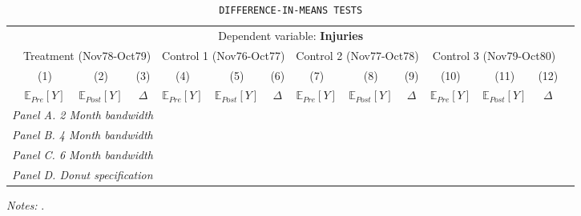  \begin{table}[H] \begin{threeparttable} \centering \caption{\texttt{DIFFERENCE-IN-MEANS TESTS}} {\def\sym#1{\ifmmode^{#1}\else\(^{#1}\)\fi} \begin{tabular}{l*{13}{c}} \toprule & \multicolumn{12}{c}{Dependent variable: \textbf{Injuries}} \\ \cmidrule(lr){2-13}
            &\multicolumn{3}{c}{Treatment (Nov78-Oct79)}&\multicolumn{3}{c}{Control 1 (Nov76-Oct77)}&\multicolumn{3}{c}{Control 2 (Nov77-Oct78)}&\multicolumn{3}{c}{Control 3 (Nov79-Oct80)}\\\cmidrule(lr){2-4}\cmidrule(lr){5-7}\cmidrule(lr){8-10}\cmidrule(lr){11-13}
            &\multicolumn{1}{c}{(1)}&\multicolumn{1}{c}{(2)}&\multicolumn{1}{c}{(3)}&\multicolumn{1}{c}{(4)}&\multicolumn{1}{c}{(5)}&\multicolumn{1}{c}{(6)}&\multicolumn{1}{c}{(7)}&\multicolumn{1}{c}{(8)}&\multicolumn{1}{c}{(9)}&\multicolumn{1}{c}{(10)}&\multicolumn{1}{c}{(11)}&\multicolumn{1}{c}{(12)}\\
            &\multicolumn{1}{c}{$\mathbb{E}_{Pre}[Y]$}&\multicolumn{1}{c}{$\mathbb{E}_{Post}[Y]$}&\multicolumn{1}{c}{$\Delta$}&\multicolumn{1}{c}{$\mathbb{E}_{Pre}[Y]$}&\multicolumn{1}{c}{$\mathbb{E}_{Post}[Y]$}&\multicolumn{1}{c}{$\Delta$}&\multicolumn{1}{c}{$\mathbb{E}_{Pre}[Y]$}&\multicolumn{1}{c}{$\mathbb{E}_{Post}[Y]$}&\multicolumn{1}{c}{$\Delta$}&\multicolumn{1}{c}{$\mathbb{E}_{Pre}[Y]$}&\multicolumn{1}{c}{$\mathbb{E}_{Post}[Y]$}&\multicolumn{1}{c}{$\Delta$}\\
\midrule
 \multicolumn{13}{l}{\emph{Panel A. 2 Month bandwidth}} \\    \midrule\multicolumn{13}{l}{\emph{Panel B. 4 Month bandwidth}} \\    \midrule\multicolumn{13}{l}{\emph{Panel C. 6 Month bandwidth}} \\    \midrule\multicolumn{13}{l}{\emph{Panel D. Donut specification}} \\    
\bottomrule \end{tabular} } \begin{tablenotes} \item \scriptsize \emph{Notes:} . \end{tablenotes} \end{threeparttable} \end{table} 
